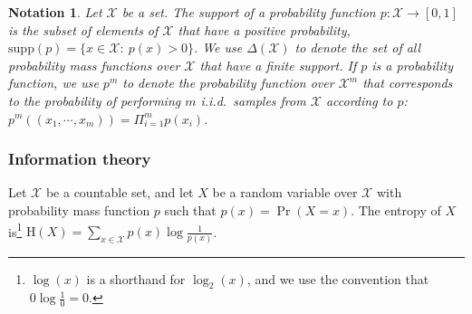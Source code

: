 \documentclass[final,12pt]{colt2018}
\newcommand{\HH}{\mathrm{H}}
\newcommand{\mc}[1]{\mathcal{#1}}
\newcommand{\mb}{\mathbb}
\newcommand{\cX}{\mc{X}}
\newcommand{\supp}{\mathrm{supp}}
\newtheorem{notation}{Notation}[section]
\begin{document}


\begin{notation}\label{definition-delta}
	Let $\cX$ be a set. The support of a probability function $p:\cX \to [0,1]$ is the subset of elements of $\cX$ that have a positive probability, $\supp(p)=\{x\in \cX:\: p(x)>0\}$. We use $\Delta(\cX)$ to denote the set of all probability mass functions over $\cX$ that have a finite support. If $p$ is a probability function, we use $p^m$ to denote the probability function over $\cX^m$ that corresponds to the probability of performing $m$ i.i.d.\ samples from $\cX$ according to $p$: $p^m((x_1,\cdots,x_m)) = \Pi_{i=1}^m p(x_i)$.
\end{notation}
%

\subsubsection*{Information theory}

\begin{definition}
	Let $\cX$ be a countable set, and let $X$ be a random variable over $\cX$ with probability mass function $p$ such that $p(x)=\Pr(X = x)$. The {entropy of $X$} is\footnote{$\log (x)$ is a shorthand for $\log_2(x)$, and we use the convention that $0\log\frac{1}{0}=0$.}
$\HH(X) = \sum_{x \in \cX} p(x)\log\frac{1}{p(x)}$.
\end{definition}

\end{document}
